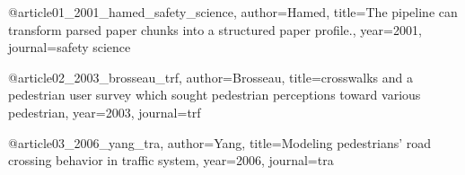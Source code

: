 @article{01_2001_hamed_safety_science,
  author={Hamed},
  title={The pipeline can transform parsed paper chunks into a structured paper profile.},
  year={2001},
  journal={safety science}
}

@article{02_2003_brosseau_trf,
  author={Brosseau},
  title={crosswalks and a pedestrian user survey which sought pedestrian perceptions toward various pedestrian},
  year={2003},
  journal={trf}
}

@article{03_2006_yang_tra,
  author={Yang},
  title={Modeling pedestrians’ road crossing behavior in traffic system},
  year={2006},
  journal={tra}
}
